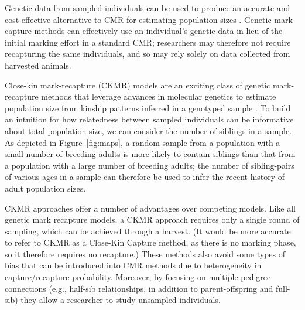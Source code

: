\documentclass[11pt]{article}
\begin{document}
Genetic data from sampled individuals can be used to produce
an accurate and cost-effective alternative to CMR 
for estimating population sizes \citep{Skaug2001,Hettiarachchige2018}. 
Genetic mark-capture methods can effectively use 
an individual's genetic data in lieu of
the initial marking effort in a standard CMR; 
researchers may therefore 
not require recapturing the same individuals,
and so may rely solely on data collected from harvested animals.

Close-kin mark-recapture (CKMR) models 
are an exciting class of genetic mark-recapture methods 
that leverage advances in molecular genetics 
to estimate population size 
from kinship patterns inferred in a genotyped sample 
\citep{bravington2016closekin,ruzzante2019validation}.
To build an intuition for how relatedness 
between sampled individuals can be informative 
about total population size, 
we can consider the number of siblings in a sample.
As depicted in Figure~\ref{fig:maps},
a random sample from a population 
with a small number of breeding adults 
is more likely to contain siblings than that 
from a population with a large number of breeding adults; 
the number of sibling-pairs of various ages in a sample can 
therefore be used to infer the recent history of adult population sizes.

CKMR approaches offer a number of advantages 
over competing models. 
Like all genetic mark recapture models, 
a CKMR approach requires only a single round of sampling, 
which can be achieved through a harvest.
(It would be more accurate to refer to CKMR as 
a Close-Kin Capture method, 
as there is no marking phase, 
so it therefore requires no recapture.)
These methods also avoid some types of bias 
that can be introduced into CMR methods due to 
heterogeneity in capture/recapture probability.
Moreover, by focusing on multiple pedigree connections 
(e.g., half-sib relationships, 
in addition to parent-offspring and full-sib) 
they allow a researcher to study unsampled individuals.
\end{document}
